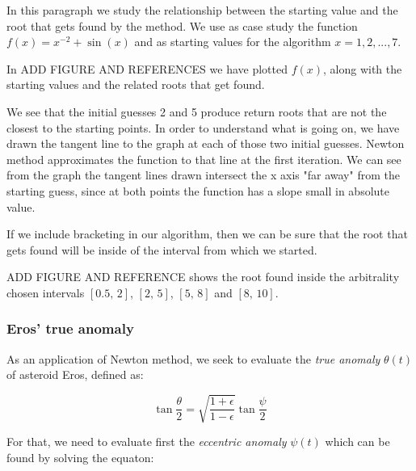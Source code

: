 \documentclass[a4paper,11]{article}
\begin{document}
In this paragraph we study the relationship between the starting value and the
root that gets found by the method. We use as case study the function 
$f(x) = x^{-2} + \sin(x)$ and as starting values for the algorithm 
$x = 1, 2, ..., 7$.

In ADD FIGURE AND REFERENCES we have plotted $f(x)$, along with the starting
values and the related roots that get found.

We see that the initial guesses 2 and 5 produce return roots that are not
the closest to the starting points. 
In order to understand what is going on, we have drawn the tangent line 
to the graph at each of those two initial guesses. Newton method approximates
the function to that line at the first iteration.
We can see from the graph the tangent lines drawn intersect the x axis 
"far away" from the starting guess, since at both points the function has
a slope small in absolute value.

If we include bracketing in our algorithm, then we can be sure that the 
root that gets found will be inside of the interval from which we started.

ADD FIGURE AND REFERENCE shows the root found inside the arbitrality chosen 
intervals $[0.5,\,2]$, $[2,\,5]$, $[5,\,8]$ and $[8,\,10]$.

\subsubsection{Eros' true anomaly}

As an application of Newton method, we seek to evaluate the \textit{true anomaly}
$\theta(t)$ of asteroid Eros, defined as:

\[
	\tan{\frac{\theta}{2}} = \sqrt{\frac{1+\epsilon}{1-\epsilon}}
	\tan{\frac{\psi}{2}}
\]

For that, we need to evaluate first the \textit{eccentric anomaly} $\psi(t)$ 
which can be found by solving the equaton:
\end{document}
